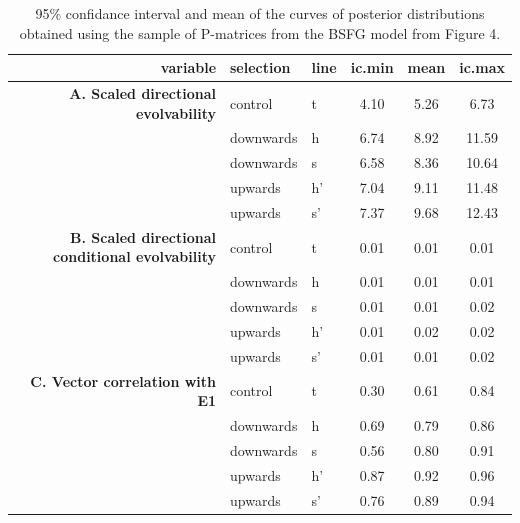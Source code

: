 \begin{refsection}
\begin{table}
\centering
\caption{95\% confidance interval and mean of the curves of posterior distributions obtained using the sample of P-matrices from the BSFG model from Figure 4.}
\begin{tabular}{rllccc}
  \hline
variable & selection & line & ic.min & mean & ic.max \\
  \hline
\textbf{A. Scaled directional evolvability} & control & t & 4.10 & 5.26 & 6.73 \\
  & downwards & h & 6.74 & 8.92 & 11.59 \\
   & downwards & s & 6.58 & 8.36 & 10.64 \\
   & upwards & h' & 7.04 & 9.11 & 11.48 \\
   & upwards & s' & 7.37 & 9.68 & 12.43 \\
\textbf{B. Scaled directional conditional evolvability} & control & t & 0.01 & 0.01 & 0.01 \\
   & downwards & h & 0.01 & 0.01 & 0.01 \\
   & downwards & s & 0.01 & 0.01 & 0.02 \\
   & upwards & h' & 0.01 & 0.02 & 0.02 \\
   & upwards & s' & 0.01 & 0.01 & 0.02 \\
\textbf{C. Vector correlation with E1} & control & t & 0.30 & 0.61 & 0.84 \\
   & downwards & h & 0.69 & 0.79 & 0.86 \\
   & downwards & s & 0.56 & 0.80 & 0.91 \\
   & upwards & h' & 0.87 & 0.92 & 0.96 \\
   & upwards & s' & 0.76 & 0.89 & 0.94 \\
   \hline
\end{tabular}
\end{table}


\end{refsection}
